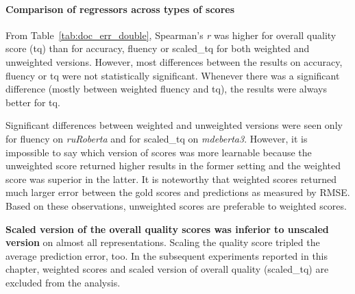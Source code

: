 \paragraph{Comparison of regressors across types of scores}
From Table~\ref{tab:doc_err_double}, Spearman's \textit{r} was higher for overall quality score (tq) than for accuracy, fluency or scaled\_tq for both weighted and unweighted versions. However, most differences between the results on accuracy, fluency or tq were not statistically significant. Whenever there was a significant difference (mostly between weighted fluency and tq), the results were always better for tq.

Significant differences between weighted and unweighted versions were seen only for fluency on \textit{ruRoberta} and for scaled\_tq on \textit{mdeberta3}. However, it is impossible to say which version of scores was more learnable because the unweighted score returned higher results in the former setting and the weighted score was superior in the latter. 
It is noteworthy that weighted scores returned much larger error between the gold scores and predictions as measured by \gls*{RMSE}. 
Based on these observations, {unweighted scores are preferable to weighted scores}.

\textbf{Scaled version of the overall quality scores was inferior to unscaled version} on almost all representations. %
Scaling the quality score tripled the average prediction error, too.
In the subsequent experiments reported in this chapter, weighted scores and scaled version of overall quality (scaled\_tq) are excluded from the analysis.

